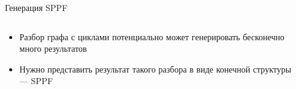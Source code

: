 \documentclass[aspectratio=169]{beamer}
\begin{document}
\begin{frame}{Генерация SPPF}
  \begin{columns}[c]
    \begin{column}{0.55\textwidth}
      \begin{itemize}
        \item Разбор графа с циклами потенциально может генерировать бесконечно много результатов
        \item Нужно представить результат такого разбора в виде конечной структуры --- SPPF
      \end{itemize}

    \end{column}
    \begin{column}{0.55\textwidth}
      \center{}
    \end{column}
  \end{columns}
\end{frame}
\end{document}
